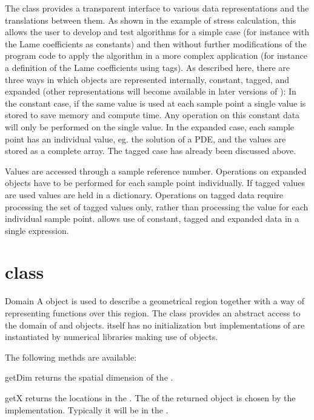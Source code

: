 The \Data class provides a transparent interface to various data representations and the 
translations between them. As shown in the example of stress calculation, this allows the user to
develop and test algorithms for a simple case (for instance with the Lame coefficients as constants)
and then without further modifications of the program code to apply the algorithm in a
more complex application (for instance a definition of the Lame coefficients using tags). 
As described here, there are three ways in which \Data objects are represented internally, constant, 
tagged, and expanded (other representations will become available in later versions of \escript):
In the constant case, if the same value is used at each sample point a single value is stored to save memory and compute time. 
Any operation on this constant data will only be performed on the single value. 
In the expanded case, each sample point has an individual value, eg. the solution of a PDE,
and the values are stored as a complete array. The tagged case has already been discussed above.
 
Values are accessed through a sample reference number. Operations on expanded \Data
objects have to be performed for each sample point individually. If tagged values are used values are
held in a dictionary. Operations on tagged data require processing the set of tagged values only, rather than 
processing the value for each individual sample point. 
\escript allows use of constant, tagged and expanded data in a single expression.

\section{\Domain class}
\begin{classdesc}{Domain}{}
A \Domain object is used to describe a geometrical region together with 
a way of representing functions over this region.
The \Domain class provides an abstract access to the domain of \FunctionSpace and \Data objects. 
\Domain itself has no initialization but implementations of \Domain are 
instantiated by numerical libraries making use of \Data objects. 
\end{classdesc}
The following methds are available:
\begin{methoddesc}[Domain]{getDim}{}
returns the spatial dimension of the \Domain.
\end{methoddesc}

\begin{methoddesc}[Domain]{getX}{}
returns the locations in the \Domain. The \FunctionSpace of the returned
\Data object is chosen by the \Domain implementation. Typically it will be
in the \Function.
\end{methoddesc}

